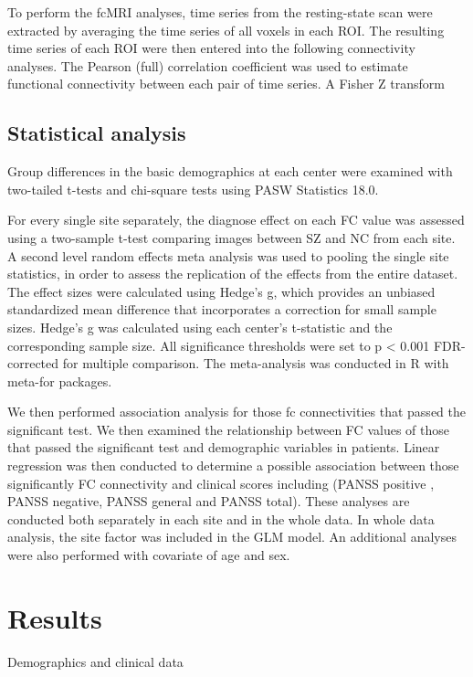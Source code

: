 \documentclass[preprint,authoryear,review,12pt]{elsarticle}
\begin{document}
To perform the fcMRI analyses, time series from the resting-state scan were extracted by averaging the time series of all voxels in each ROI. The resulting time series of each ROI were then entered into the following connectivity analyses.
The Pearson (full) correlation coefficient was used to estimate functional connectivity between each pair of time series. A Fisher Z transform  

\subsection*{Statistical analysis}

Group differences in the basic demographics at each center were examined with two-tailed t-tests and chi-square tests using PASW Statistics 18.0.

For every single site separately, the diagnose effect on each FC value was assessed using a two-sample t-test comparing images between SZ and NC from each site. A second level random effects meta analysis was used to pooling the single site statistics, in order to assess the replication of the effects from the entire dataset. The effect sizes were calculated using Hedge’s g, which provides an unbiased standardized mean difference that incorporates a correction for small sample sizes. Hedge’s g was calculated using each center’s t-statistic and the corresponding sample size. All significance thresholds were set to p < 0.001 FDR-corrected for multiple comparison. The meta-analysis was conducted in R with meta-for packages.

We then performed association analysis for those fc connectivities that passed the significant test. We then examined the relationship between FC values of those that passed the significant test and demographic variables in patients.  Linear regression was then conducted to determine a possible association between those significantly FC connectivity and clinical scores including (PANSS positive , PANSS negative, PANSS general and PANSS total). These analyses are conducted both separately in each site and in the whole data. In whole data analysis, the site factor was included in the GLM model. An additional analyses were also performed with covariate of age and sex.

\section*{Results}

Demographics and clinical data
\end{document}
